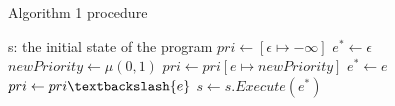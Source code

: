 \begin{algorithm}[!ht]
\caption{Algorithm 1 procedure }
\label{pos_arch}
\begin{algorithmic}[1]
    \REQUIRE  s: the initial state of the program
    \STATE $pri \leftarrow [\epsilon \mapsto -\infty ]$
        \STATE $e^* \leftarrow \epsilon$
                \STATE $newPriority \leftarrow \mu(0, 1)$
                \STATE $pri \leftarrow pri[e \mapsto newPriority]$
            \ENDIF
                \STATE $e^* \leftarrow e$
            \ENDIF
        \ENDFOR
                \STATE $pri \leftarrow pri \textbackslash \{e\}$
            \ENDIF
        \ENDFOR
        \STATE $s \leftarrow s.Execute(e^*)$
    \ENDWHILE
\end{algorithmic}  
\end{algorithm}
